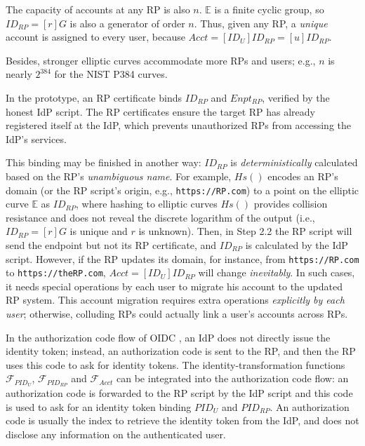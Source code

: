 The capacity of accounts at any RP is also $n$.
$\mathbb{E}$ is a finite cyclic group,
    so $ID_{RP} = [r]G$ is also a generator of order $n$.
Thus, given any RP,
    a \emph{unique} account is assigned to every user,
        because $Acct =  [ID_U]ID_{RP} = [u]ID_{RP}$.

Besides, stronger elliptic curves accommodate more RPs and users;
e.g., $n$ is nearly $2^{384}$ for the NIST P384 curves.


\vspace{0.5mm}
In the prototype, an RP certificate binds $ID_{RP}$ and $Enpt_{RP}$,
    verified by the honest IdP script.
The RP certificates ensure the target RP has already registered itself at the IdP,
 which prevents unauthorized RPs from accessing the IdP's services.

This binding may be finished in another way:
    $ID_{RP}$ is \emph{deterministically} calculated based on the RP's \emph{unambiguous name}.
For example, $Hs()$ encodes an RP's domain (or the RP script's origin, e.g., \verb+https://RP.com+) to a point on the elliptic curve $\mathbb{E}$ as $ID_{RP}$,
where
    hashing to elliptic curves $Hs()$ \cite{irtf-cfrg-hash-to-curve-16} provides collision resistance and does not reveal the discrete logarithm of the output
    (i.e., $ID_{RP} = [r]G$ is unique and $r$ is unknown).
Then,  in Step 2.2 the RP script will send the endpoint but not its RP certificate,
 and $ID_{RP}$ is calculated by the IdP script.
However, if the RP updates its domain, for instance, from \verb+https://RP.com+ to \verb+https://theRP.com+,
$Acct = [ID_U]ID_{RP}$ will change \emph{inevitably}.
In such cases,
    it needs special operations by each user to migrate his account
            to the updated RP system.
This account migration requires extra operations \emph{explicitly by each user};
    otherwise,
        colluding RPs could actually link a user's accounts across RPs.


\vspace{0.5mm}
In the authorization code flow of OIDC \cite{OpenIDConnect},
    an IdP does not directly issue the identity token;
        instead,
            an authorization code is sent to the RP,
            and then the RP uses this code to ask for identity tokens.
The identity-transformation functions $\mathcal{F}_{PID_{U}}$, $\mathcal{F}_{PID_{RP}}$ and $\mathcal{F}_{Acct}$
    can be integrated into the authorization code flow:
            an authorization code is forwarded to the RP script by the IdP script
                and this code is used to ask for an identity token binding $PID_U$ and $PID_{RP}$.
An authorization code is usually the index to retrieve the identity token from the IdP,
        and does not disclose any information on the authenticated user.



